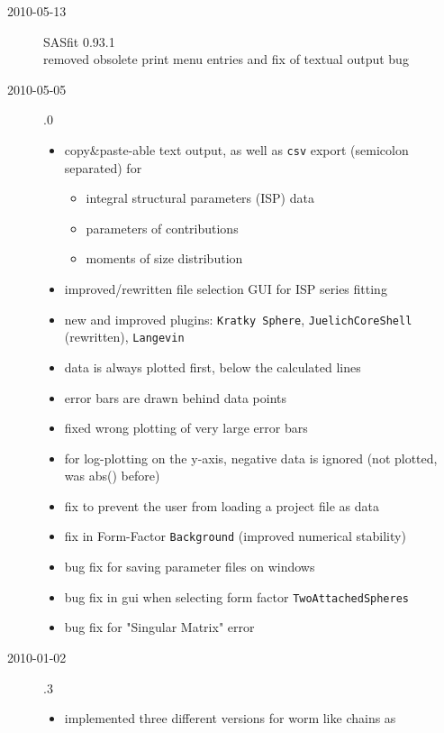 \begin{description}
\begin{itemize}
        \end{itemize}
    \item[2010-05-13] SASfit 0.93.1 \\
    removed obsolete print menu entries and fix of textual output bug
    \item[2010-05-05] .0
        \begin{itemize}
            \item copy\&paste-able text output, as well as \texttt{csv} export (semicolon separated) for
            \begin{itemize}
                \item integral structural parameters (ISP) data
                \item parameters of contributions
                \item moments of size distribution
            \end{itemize}
            \item  improved/rewritten file selection GUI for ISP series fitting
            \item  new and improved plugins: \texttt{Kratky Sphere}, \texttt{JuelichCoreShell} (rewritten), \texttt{Langevin}
            \item data is always plotted first, below the calculated lines
            \item error bars are drawn behind data points
            \item fixed wrong plotting of very large error bars
            \item for log-plotting on the y-axis, negative data is ignored (not plotted, was abs() before)
            \item fix to prevent the user from loading a \SASfit project file as data
            \item fix in Form-Factor \texttt{Background} (improved numerical stability)
            \item bug fix for saving parameter files on windows
            \item bug fix in gui when selecting form factor \texttt{TwoAttachedSpheres}
            \item bug fix for "Singular Matrix" error
        \end{itemize}
    \item[2010-01-02] .3
        \begin{itemize}
        \item implemented three different versions for worm like chains as

\end{itemize}
\end{description}
